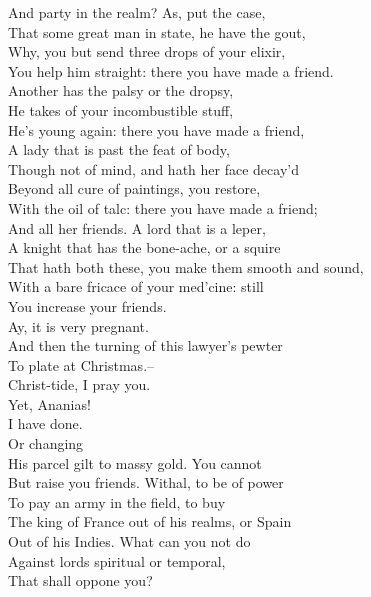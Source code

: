 \documentclass{memoir}
\begin{document}
\begin{drama*}
 And party in the realm? As, put the case,\\
 That some great man in state, he have the gout,\\
 Why, you but send three drops of your elixir,\\
 You help him straight: there you have made a friend.\\
 Another has the palsy or the dropsy,\\
 He takes of your incombustible stuff,\\
 He's young again: there you have made a friend,\\
 A lady that is past the feat of body,\\
 Though not of mind, and hath her face decay'd\\
 Beyond all cure of paintings, you restore,\\
 With the oil of talc: there you have made a friend;\\
 And all her friends. A lord that is a leper,\\
 A knight that has the bone-ache, or a squire\\
 That hath both these, you make them smooth and sound,\\
 With a bare fricace of your med'cine: still\\
 You increase your friends.\\
\tribulationspeaks {} Ay, it is very pregnant.\\
\subtlespeaks  And then the turning of this lawyer's pewter\\
 To plate at Christmas.--\\
\ananiasspeaks {} Christ-tide, I pray you.\\
\subtlespeaks  Yet, Ananias!\\
\ananiasspeaks {} I have done.\\
\subtlespeaks {} Or changing\\
 His parcel gilt to massy gold. You cannot\\
 But raise you friends. Withal, to be of power\\
 To pay an army in the field, to buy\\
 The king of France out of his realms, or Spain\\
 Out of his Indies. What can you not do\\
 Against lords spiritual or temporal,\\
 That shall oppone you?\\

\end{drama*}
\end{document}
